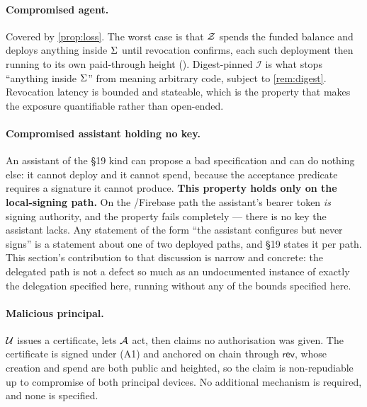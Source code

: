 \paragraph{Compromised agent.} Covered by \cref{prop:loss}. The worst case is that $\mathcal{Z}$ spends the
funded balance and deploys anything inside $\Sigma$ until revocation confirms, each such deployment
then running to its own paid-through height (). Digest-pinned
$\mathcal{I}$ is what stops ``anything inside $\Sigma$'' from meaning arbitrary code, subject to
\cref{rem:digest}. Revocation latency is bounded and stateable, which is the property that makes the
exposure quantifiable rather than open-ended.

\paragraph{Compromised assistant holding no key.} An assistant of the \S19 kind can propose a bad
specification and can do nothing else: it cannot deploy and it cannot spend, because the acceptance
predicate requires a signature it cannot produce. \textbf{This property holds only on the
local-signing path.} On the \FluxCore/Firebase path the assistant's bearer token \emph{is} signing
authority, and the property fails completely --- there is no key the assistant lacks. Any statement
of the form ``the assistant configures but never signs'' is a statement about one of two deployed
paths, and \S19 states it per path. This section's contribution to that discussion is narrow and
concrete: the delegated path is not a defect so much as an undocumented instance of exactly the
delegation specified here, running without any of the bounds specified here.

\paragraph{Malicious principal.} $\mathcal{U}$ issues a certificate, lets $\mathcal{A}$ act, then claims no
authorisation was given. The certificate is signed under (A1) and anchored on chain through
$\mathsf{rev}$, whose creation and spend are both public and heighted, so the claim is
non-repudiable up to compromise of both principal devices. No additional mechanism is required, and
none is specified.

